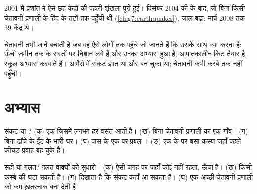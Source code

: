 \begin{history}[प्लवों का एक जाल]
2001 में प्रशांत  में ऐसे छह केंद्रों की पहली शृंखला पूरी हुई। दिसंबर 2004 की
 के बाद, जो बिना किसी चेतावनी प्रणाली के हिंद  के तटों तक पहुँची थी
(\cref{ch:g7:earthquakes}), जाल बढ़ा: मार्च 2008 तक 39 केंद्र
थे।
\end{history}

चेतावनी तभी जानें बचाती है जब वह ऐसे लोगों तक पहुँचे जो जानते हैं कि उसके साथ क्या करना
है: ऊँची ज़मीन तक के रास्तों पर निशान लगे हैं और उनका अभ्यास हुआ है, आपातकालीन किट तैयार
है, स्कूल अभ्यास करवाते हैं। आर्मेरो में संकट ज्ञात था और  बन चुका था; चेतावनी
कभी कस्बे तक नहीं पहुँची।

\section{अभ्यास}

\begin{exercise}[$\star$]\label{exo:g9:natural-risks:1}
संकट या ? (क) एक  जिसमें लगभग हर वसंत  आती है। (ख) बिना चेतावनी प्रणाली
का एक गाँव। (ग) बिना ढाँचे के ईंट के भारी घर। (घ) पास के एक  पर प्रबल ।
(ङ) एक  के  पर बसा कस्बा जहाँ पहले कीचड़ प्रवाह बह चुके
हैं।
\end{exercise}

\begin{exercise}[$\star$]\label{exo:g9:natural-risks:2}
सही या ग़लत? ग़लत वाक्यों को सुधारो। (क) ऐसी जगह पर  जहाँ कोई नहीं रहता,
ऊँचा  है। (ख)  किसी कस्बे की  घटा सकती है। (ग)  दिखाता
है कि संकट कहाँ आ सकता है। (घ) एक अच्छी चेतावनी प्रणाली  को कम ख़तरनाक बना
देती है।
\end{exercise}

